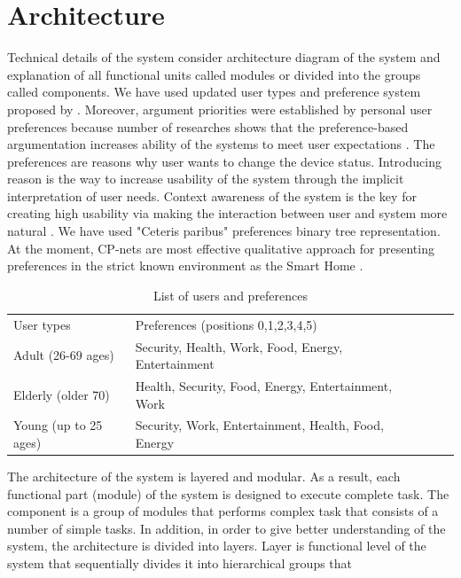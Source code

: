 \documentclass{llncs}
\begin{document}
    \section{Architecture}
    Technical details of the system
    consider architecture diagram of the system and explanation of all functional units called modules
    or divided into the groups called components.
    We have used updated user types and preference system proposed by \cite{9}.
    Moreover, argument priorities were established by personal user preferences \cite{11} because
    number of researches shows that the preference-based argumentation increases ability of the systems to meet user
    expectations \cite{10}.
    The preferences are reasons why user wants to change the device status.
    Introducing reason is the way to increase usability of the system through the implicit interpretation of user needs.
    Context awareness of the system is the key for creating high usability via making the interaction
    between user and system more natural \cite{7}.
    We have used "Ceteris paribus" preferences binary tree representation.
    At the moment, CP-nets are most effective qualitative approach for presenting preferences in the strict known
    environment as the Smart Home \cite{10}.
    \begin{table}
        \caption{List of users and preferences}
        \begin{tabular}{llllll}
            \hline\noalign{\smallskip}
            User types & Preferences (positions 0,1,2,3,4,5)\\
            \noalign{\smallskip}
            \hline
            \noalign{\smallskip}
            Adult (26-69 ages) & Security, Health, Work, Food, Energy, Entertainment\\
            Elderly (older 70) & Health, Security, Food, Energy, Entertainment, Work\\
            Young (up to 25 ages) & Security, Work, Entertainment, Health, Food, Energy\\
            \hline
        \end{tabular}
    \end{table}
    The architecture of the system is layered and modular.
    As a result, each functional part (module) of the system is designed to execute complete task.
    The component is a group of modules that performs complex task that consists of a number of simple tasks.
    In addition, in order to give better understanding of the system, the architecture is divided into layers.
    Layer is functional level of the system that sequentially divides it into hierarchical groups that
\end{document}
